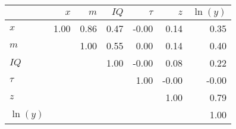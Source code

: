 \begin{tabular}{lrrrrrr}
\hline
 & $x$  & $m$  & $IQ$  & $\tau$  & $z$  & $\ln(y)$  \\ 
\hline
$x$ & 1.00  & 0.86  & 0.47  & -0.00  & 0.14  & 0.35  \\ 
$m$ &   & 1.00  & 0.55  & 0.00  & 0.14  & 0.40  \\ 
$IQ$ &   &   & 1.00  & -0.00  & 0.08  & 0.22  \\ 
$\tau$ &   &   &   & 1.00  & -0.00  & -0.00  \\ 
$z$ &   &   &   &   & 1.00  & 0.79  \\ 
$\ln(y)$ &   &   &   &   &   & 1.00  \\ 
\hline
\end{tabular}%
